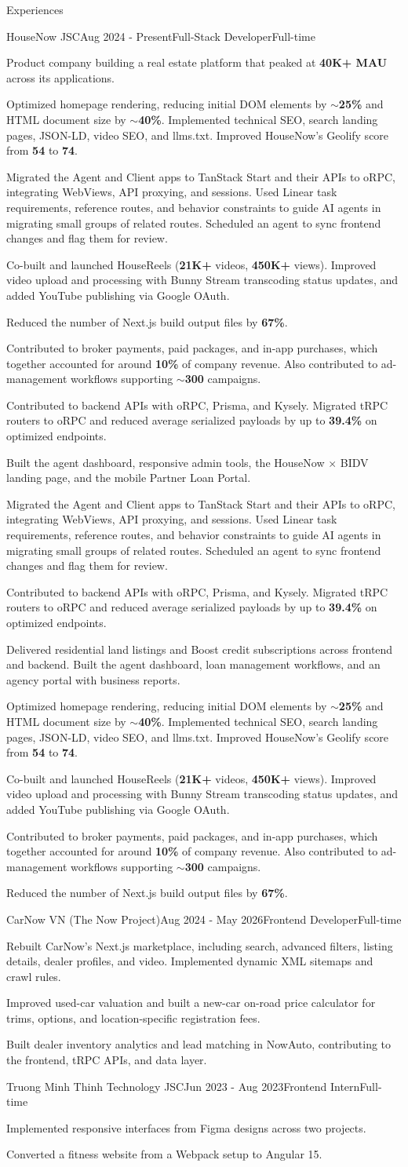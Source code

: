 \documentclass{resume}
\newcommand{\architectureMigration}{Migrated the Agent and Client apps to TanStack Start and their APIs to oRPC, integrating WebViews, API proxying, and sessions. Used Linear task requirements, reference routes, and behavior constraints to guide AI agents in migrating small groups of related routes. Scheduled an agent to sync frontend changes and flag them for review.}
\newcommand{\homepagePerformance}{Optimized homepage rendering, reducing initial DOM elements by \textbf{$\sim$25\%} and HTML document size by \textbf{$\sim$40\%}.}
\newcommand{\houseNowSEO}{Implemented technical SEO, search landing pages, JSON-LD, video SEO, and llms.txt. Improved HouseNow's Geolify score from \textbf{54} to \textbf{74}.}
\newcommand{\houseNowAPIs}{Contributed to backend APIs with oRPC, Prisma, and Kysely. Migrated tRPC routers to oRPC and reduced average serialized payloads by up to \textbf{39.4\%} on optimized endpoints.}
\newcommand{\houseReels}{Co-built and launched HouseReels (\textbf{21K+} videos, \textbf{450K+} views). Improved video upload and processing with Bunny Stream transcoding status updates, and added YouTube publishing via Google OAuth.}
\newcommand{\brokerMonetization}{Contributed to broker payments, paid packages, and in-app purchases, which together accounted for around \textbf{10\%} of company revenue. Also contributed to ad-management workflows supporting \textbf{$\sim$300} campaigns.}
\begin{document}
\begin{rSection}{Experiences}
\begin{rSubsection}{HouseNow JSC}{Aug 2024 - Present}{Full-Stack Developer}{Full-time}
\item[] Product company building a real estate platform that peaked at \textbf{40K+ MAU} across its applications.
\ifdefined\cvFrontend
\item \homepagePerformance{} \houseNowSEO
\item \architectureMigration
\item \houseReels
\item Reduced the number of Next.js build output files by \textbf{67\%}.
\item \brokerMonetization
\item \houseNowAPIs
\item Built the agent dashboard, responsive admin tools, the HouseNow \(\times\) BIDV landing page, and the mobile Partner Loan Portal.
\else
\item \architectureMigration
\item \houseNowAPIs
\item Delivered residential land listings and Boost credit subscriptions across frontend and backend. Built the agent dashboard, loan management workflows, and an agency portal with business reports.
\item \homepagePerformance{} \houseNowSEO
\item \houseReels
\item \brokerMonetization
\item Reduced the number of Next.js build output files by \textbf{67\%}.
\fi
\end{rSubsection}
\begin{rSubsection}{CarNow VN (The Now Project)}{Aug 2024 - May 2026}{Frontend Developer}{Full-time}
\item Rebuilt CarNow's Next.js marketplace, including search, advanced filters, listing details, dealer profiles, and video. Implemented dynamic XML sitemaps and crawl rules.
\item Improved used-car valuation and built a new-car on-road price calculator for trims, options, and location-specific registration fees.
\item Built dealer inventory analytics and lead matching in NowAuto, contributing to the frontend, tRPC APIs, and data layer.
\end{rSubsection}
\begin{rSubsection}{Truong Minh Thinh Technology JSC}{Jun 2023 - Aug 2023}{Frontend Intern}{Full-time}
\item Implemented responsive interfaces from Figma designs across two projects.
\item Converted a fitness website from a Webpack setup to Angular 15.
\end{rSubsection}
\end{rSection}
\end{document}
